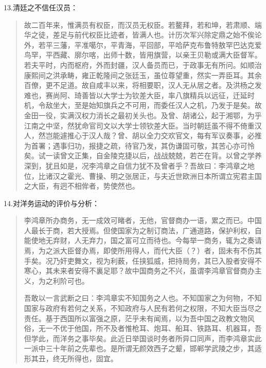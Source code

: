 13.清廷之不信任汉员：
\begin{quotation}
故二百年来，惟满员有权臣，而汉员无权臣。若鳌拜，若和坤，若肃顺、端华之徒，差足与前代权臣比迹者，皆满人也。计历次军兴除定鼎之始不俟论外，若平三藩，平准噶尔，平青海，平回部，平哈萨克布鲁特敖罕巴达克爱鸟罕，平西藏、廓尔喀，出师十数，皆用旗营，以亲王贝勒或满大臣督军。若夫平时，内而枢府，外而封疆，汉人备员而已，于政事无有所问。如顺治康熙间之洪承畴，雍正乾隆间之张廷玉，虽位尊望重，然实一弄臣耳。其余百僚，更不足道。故自咸丰以来，将相要职，汉人无从居之者。及洪杨之发难也，赛尚阿、琦善皆以大学士为钦差大臣，率八旗精兵以远征，迁延时机，令敌坐大，至是始知旗兵之不可用，而委任汉人之机，乃发于是矣。故金田一役，实满汉权力消长之最初关头也。及曾、胡诸公，起于湘鄂，为乎江南之中坚，然犹命官司文以大学士领钦差大臣。当时朝廷虽不得不倚重汉人，然岂能遽推心于汉人哉？曾、胡以全力交欢官文，每有军议奏事，必推为首署；遇事归功，报捷之疏，待官乃发，其伪谦固可敬，其苦心亦可怜矣。试一读曾文正集，自金陵克捷以后，战战兢兢，若芒在背。以曾之学养深到，犹且如是，况李鸿章之自信力犹不及曾者乎？吾故曰：李鸿章之地位，比诸汉之霍光、曹操、明之张居正，与夫近世欧洲日本所谓立宪君主国之大臣，有迥不相侔者，势使然也。
\end{quotation}


14.对洋务运动的评价与分析：
\begin{quotation}
李鸿章所办商务，无一成效可睹者，无他，官督商办一语，累之而已。中国人最长于商，若大授焉。但使国家为之制订商法，广通道路，保护利权，自能使地无弃财，人无弃力，国之富可立而待也。今每举一商务，辄为之奏请焉，为之派大臣督办焉，即使所用得人，而代大臣（？）者，固未有不伤其手矣。况乃奸吏舞文，视为利薮，任挟狐威，把持局务，其已入股者安得不寒心，其未来者安得不裏足耶？故中国商务之不兴，虽谓李鸿章官督商办主义，为之利阶可也。

吾敢以一言武断之曰：李鸿章实不知国务之人也。不知国家之为何物，不知国家与政府有若何之关系，不知政府与人民有若何之权限，不知大臣当尽之责任。基于西国所以富强之原，茫乎未有闻焉，以为吾中国之政教文物风俗，无一不优于他国，所不及者惟枪耳、炮耳、船耳、铁路耳、机器耳，吾但学此，而洋务之事毕矣。此近日举国谈时务者所异口同声，而李鸿章实此一派中三十年前之先辈也。是所谓无颜效西子之颦，邯郸学武陵之步，其适形其丑，终无所得也，固宜。
\end{quotation}

